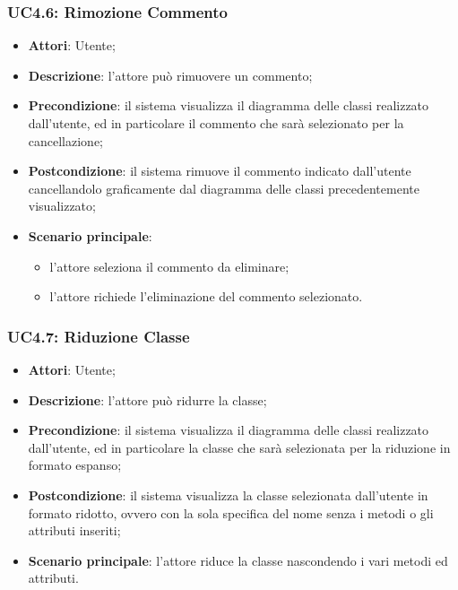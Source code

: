 \begin{itemize}
\begin{itemize}
\begin{itemize}
\begin{itemize}
\subsubsection{UC4.6: Rimozione Commento}
\label{UC4.6}
\begin{itemize}
	\item \textbf{Attori}: Utente;
	\item \textbf{Descrizione}: l'attore può rimuovere un commento;
	\item \textbf{Precondizione}: il sistema visualizza il diagramma delle classi realizzato dall'utente, ed in particolare il commento che sarà selezionato per la cancellazione;
	\item \textbf{Postcondizione}: il sistema rimuove il commento indicato dall'utente cancellandolo graficamente dal diagramma delle classi precedentemente visualizzato;
	\item \textbf{Scenario principale}:
	\begin{itemize}
		\item l'attore seleziona il commento da eliminare;
		\item l'attore richiede l'eliminazione del commento selezionato.
	\end{itemize}
\end{itemize}

\subsubsection{UC4.7: Riduzione Classe}
\label{UC4.7}
\begin{itemize}
	\item \textbf{Attori}: Utente;
	\item \textbf{Descrizione}: l'attore può ridurre la classe;
	\item \textbf{Precondizione}: il sistema visualizza il diagramma delle classi realizzato dall'utente, ed in particolare la classe che sarà selezionata per la riduzione in formato espanso;
	\item \textbf{Postcondizione}: il sistema visualizza la classe selezionata dall'utente in formato ridotto, ovvero con la sola specifica del nome senza i metodi o gli attributi inseriti;
	\item \textbf{Scenario principale}: l'attore riduce la classe nascondendo i vari metodi ed attributi.
\end{itemize}


\end{itemize}
\end{itemize}
\end{itemize}
\end{itemize}
